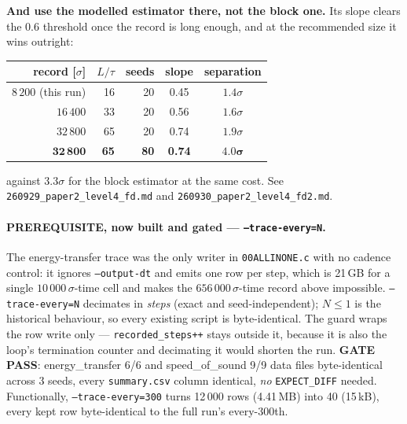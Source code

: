 \documentclass[11pt,a4paper]{article}
\begin{document}
\textbf{And use the modelled estimator there, not the block one.} Its slope clears the $0.6$
threshold once the record is long enough, and at the recommended size it wins outright:
\begin{center}
\begin{tabular}{rrrcc}
\toprule
record [$\sigma$] & $L/\tau$ & seeds & slope & separation \\
\midrule
$8\,200$ (this run) & 16 & 20 & 0.45 & $1.4\sigma$ \\
$16\,400$ & 33 & 20 & 0.56 & $1.6\sigma$ \\
$32\,800$ & 65 & 20 & 0.74 & $1.9\sigma$ \\
$\mathbf{32\,800}$ & \textbf{65} & \textbf{80} & \textbf{0.74} & $\mathbf{4.0\sigma}$ \\
\bottomrule
\end{tabular}
\end{center}
against $3.3\sigma$ for the block estimator at the same cost. See
\texttt{260929\_paper2\_level4\_fd.md} and \texttt{260930\_paper2\_level4\_fd2.md}.

\paragraph{PREREQUISITE, now built and gated --- \texttt{--trace-every=N}.} The energy-transfer
trace was the only writer in \texttt{00ALLINONE.c} with no cadence control: it ignores
\texttt{--output-dt} and emits one row per step, which is 21\,GB for a single $10\,000\,\sigma$-time
cell and makes the $656\,000\,\sigma$-time record above impossible. \texttt{--trace-every=N}
decimates in \emph{steps} (exact and seed-independent); $N \le 1$ is the historical behaviour, so
every existing script is byte-identical. The guard wraps the row write only --- \texttt{recorded\_steps++}
stays outside it, because it is also the loop's termination counter and decimating it would shorten
the run. \textbf{GATE PASS}: energy\_transfer 6/6 and speed\_of\_sound 9/9 data files byte-identical
across 3 seeds, every \texttt{summary.csv} column identical, \emph{no} \texttt{EXPECT\_DIFF} needed.
Functionally, \texttt{--trace-every=300} turns 12\,000 rows (4.41\,MB) into 40 (15\,kB), every kept
row byte-identical to the full run's every-300th.
\end{document}
